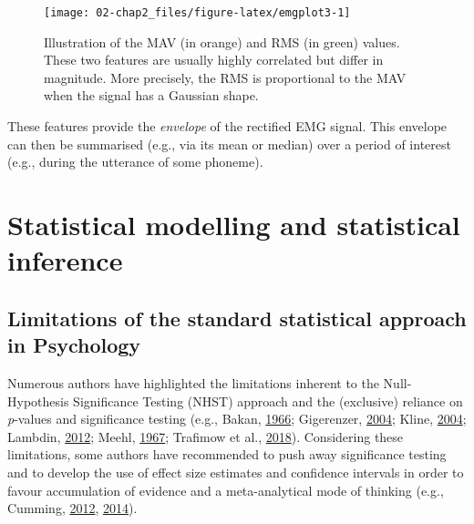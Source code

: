 \documentclass[a4paper,12pt,twoside,onecolumn,openright,final,oldfontcommands]{memoir}
\begin{document}
\begin{figure}[ht]

{\centering \texttt{[image: 02-chap2\_files/figure-latex/emgplot3-1]} 

}

\caption{Illustration of the MAV (in orange) and RMS (in green) values. These two features are usually highly correlated but differ in magnitude. More precisely, the RMS is proportional to the MAV when the signal has a Gaussian shape.}\label{fig:emgplot3}
\end{figure}

These features provide the \emph{envelope} of the rectified EMG signal. This envelope can then be summarised (e.g., via its mean or median) over a period of interest (e.g., during the utterance of some phoneme).

\hypertarget{statistical-modelling-and-statistical-inference}{%
\section{Statistical modelling and statistical inference}\label{statistical-modelling-and-statistical-inference}}

\hypertarget{limitations-of-the-standard-statistical-approach-in-psychology}{%
\subsection{Limitations of the standard statistical approach in Psychology}\label{limitations-of-the-standard-statistical-approach-in-psychology}}

Numerous authors have highlighted the limitations inherent to the Null-Hypothesis Significance Testing (NHST) approach and the (exclusive) reliance on \emph{p}-values and significance testing (e.g., Bakan, \protect\hyperlink{ref-bakan_test_1966}{1966}; Gigerenzer, \protect\hyperlink{ref-Gigerenzer2004}{2004}; Kline, \protect\hyperlink{ref-Kline2004}{2004}; Lambdin, \protect\hyperlink{ref-Lambdin2012}{2012}; Meehl, \protect\hyperlink{ref-meehl_theory-testing_1967}{1967}; Trafimow et al., \protect\hyperlink{ref-trafimow_manipulating_2018}{2018}). Considering these limitations, some authors have recommended to push away significance testing and to develop the use of effect size estimates and confidence intervals in order to favour accumulation of evidence and a meta-analytical mode of thinking (e.g., Cumming, \protect\hyperlink{ref-Cumming2012}{2012}, \protect\hyperlink{ref-cumming_new_2014}{2014}).
\end{document}
